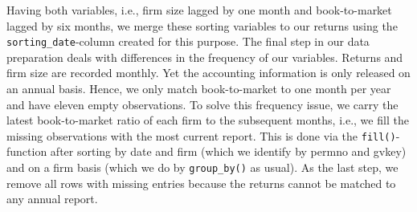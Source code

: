 \documentclass[
]{krantz}
\begin{document}
Having both variables, i.e., firm size lagged by one month and book-to-market lagged by six months, we merge these sorting variables to our returns using the \texttt{sorting\_date}-column created for this purpose. The final step in our data preparation deals with differences in the frequency of our variables. Returns and firm size are recorded monthly. Yet the accounting information is only released on an annual basis. Hence, we only match book-to-market to one month per year and have eleven empty observations. To solve this frequency issue, we carry the latest book-to-market ratio of each firm to the subsequent months, i.e., we fill the missing observations with the most current report. This is done via the \texttt{fill()}-function after sorting by date and firm (which we identify by permno and gvkey) and on a firm basis (which we do by \texttt{group\_by()} as usual). As the last step, we remove all rows with missing entries because the returns cannot be matched to any annual report.
\end{document}
